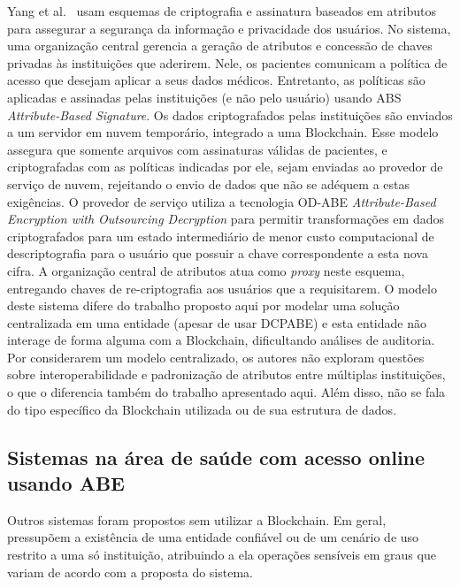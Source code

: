 \documentclass[a4paper,11pt]{article}
\begin{document}
Yang et al.~\cite{Yang2020} usam esquemas de criptografia e assinatura baseados em atributos para assegurar a segurança da informação e privacidade dos usuários. No sistema, uma organização central gerencia a geração de atributos e concessão de chaves privadas às instituições que aderirem.
Nele, os pacientes comunicam a política de acesso que desejam aplicar a seus dados médicos. Entretanto, as políticas são aplicadas e assinadas pelas instituições (e não pelo usuário) usando ABS \emph{Attribute-Based Signature}.
Os dados criptografados pelas instituições são enviados a um servidor em nuvem temporário, integrado a uma Blockchain. Esse modelo assegura que somente arquivos com assinaturas válidas de pacientes, e criptografadas com as políticas indicadas por ele, sejam enviadas ao provedor de serviço de nuvem, rejeitando o envio de dados que não se adéquem a estas exigências.
O provedor de serviço utiliza a tecnologia OD-ABE \emph{Attribute-Based Encryption with Outsourcing Decryption} para permitir transformações em dados criptografados para um estado intermediário de menor custo computacional de descriptografia para o usuário que possuir a chave correspondente a esta nova cifra.
A organização central de atributos atua como \emph{proxy} neste esquema, entregando chaves de re-criptografia aos usuários que a requisitarem.
O modelo deste sistema difere do trabalho proposto aqui por modelar uma solução centralizada em uma entidade (apesar de usar DCPABE) e esta entidade não interage de forma alguma com a Blockchain, dificultando análises de auditoria.
Por considerarem um modelo centralizado, os autores não exploram questões sobre interoperabilidade e padronização de atributos entre múltiplas instituições, o que o diferencia também do trabalho apresentado aqui.
Além disso, não se fala do tipo específico da Blockchain utilizada ou de sua estrutura de dados.

\subsection{Sistemas na área de saúde com acesso online usando ABE}
\label{sec:sub:saude-nuvem-cba}

Outros sistemas foram propostos sem utilizar a Blockchain. Em geral, pressupõem a existência de uma entidade confiável ou de um cenário de uso restrito a uma só instituição, atribuindo a ela operações sensíveis em graus que variam de acordo com a proposta do sistema.
\end{document}
